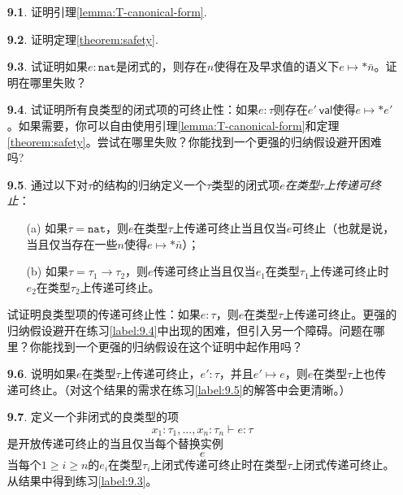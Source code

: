 \begin{itemize}
\item[\textbf{9.1}.] 证明引理\ref{lemma:T-canonical-form}.
\item[\textbf{9.2}.] 证明定理\ref{theorem:safety}.
\item[\textbf{9.3}.] \label{label:9.3} 试证明如果$e:\mathtt{nat}$是闭式的，则存在$n$使得在及早求值的语义下$e\longmapsto*\bar{n}$。证明在哪里失败？
\item[\textbf{9.4}.] \label{label:9.4} 试证明所有良类型的闭式项的可终止性：如果$e:\tau$则存在$e'\ \mathsf{val}$使得$e\longmapsto*e'$。如果需要，你可以自由使用引理\ref{lemma:T-canonical-form}和定理\ref{theorem:safety}。尝试在哪里失败？你能找到一个更强的归纳假设避开困难吗?
\item[\textbf{9.5}.] \label{label:9.5} 通过以下对$\tau$的结构的归纳定义一个$\tau$类型的闭式项$e$\textit{在类型$\tau$上传递可终止}：
\begin{itemize}
\item[(a)] 如果$\tau=\mathtt{nat}$，则$e$在类型$\tau$上传递可终止当且仅当$e$可终止（也就是说，当且仅当存在一些$n$使得$e\longmapsto*\bar{n}$）；
\item[(b)] 如果$\tau=\tau_1\to\tau_2$，则$e$传递可终止当且仅当$e_1$在类型$\tau_1$上传递可终止时$e_2$在类型$\tau_2$上传递可终止。
\end{itemize}
试证明良类型项的传递可终止性：如果$e:\tau$，则$e$在类型$\tau$上传递可终止。更强的归纳假设避开在练习\ref{label:9.4}中出现的困难，但引入另一个障碍。问题在哪里？你能找到一个更强的归纳假设在这个证明中起作用吗？
\item[\textbf{9.6}.] 说明如果$e$在类型$\tau$上传递可终止，$e':\tau$，并且$e'\longmapsto e$，则$e$在类型$\tau$上也传递可终止。（对这个结果的需求在练习\ref{label:9.5}的解答中会更清晰。）
\item[\textbf{9.7}.] 定义一个非闭式的良类型的项
\begin{equation*}
x_1:\tau_1,...,x_n:\tau_n\vdash e:\tau
\end{equation*}
是开放传递可终止的当且仅当每个替换实例
\begin{equation*}
[e_1,...,e_n/x_1,...,x_n]e
\end{equation*}
当每个$1\ge i\ge n$的$e_i$在类型$\tau_i$上闭式传递可终止时在类型$\tau$上闭式传递可终止。从结果中得到练习\ref{label:9.3}。
\end{itemize}
